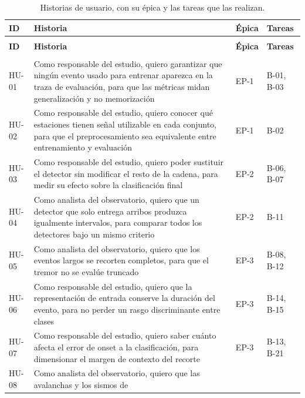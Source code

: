 {\small
\begin{longtable}{>{\raggedright\arraybackslash}p{1.2cm}>{\raggedright\arraybackslash}p{7.6cm}>{\raggedright\arraybackslash}p{1.0cm}>{\raggedright\arraybackslash}p{1.9cm}}
\caption{Historias de usuario, con su épica y las tareas que las realizan.}\label{tab:historias}\\
\toprule
\textbf{ID} & \textbf{Historia} & \textbf{Épica} & \textbf{Tareas} \\
\midrule
\endfirsthead
\multicolumn{4}{l}{\itshape Cuadro \thetable{} (continuación)}\\
\toprule
\textbf{ID} & \textbf{Historia} & \textbf{Épica} & \textbf{Tareas} \\
\midrule
\endhead
\midrule
\multicolumn{4}{r}{\itshape Continúa en la página siguiente}\\
\endfoot
\bottomrule
\endlastfoot
HU-01 & Como responsable del estudio, quiero garantizar que ningún evento usado
para entrenar aparezca en la traza de evaluación, para que las métricas midan
generalización y no memorización & EP-1 & B-01, B-03 \\
\addlinespace
HU-02 & Como responsable del estudio, quiero conocer qué estaciones tienen señal
utilizable en cada conjunto, para que el preprocesamiento sea equivalente entre
entrenamiento y evaluación & EP-1 & B-02 \\
\addlinespace
HU-03 & Como responsable del estudio, quiero poder sustituir el detector sin
modificar el resto de la cadena, para medir su efecto sobre la clasificación
final & EP-2 & B-06, B-07 \\
\addlinespace
HU-04 & Como analista del observatorio, quiero que un detector que solo entrega
arribos produzca igualmente intervalos, para comparar todos los detectores bajo un
mismo criterio & EP-2 & B-11 \\
\addlinespace
HU-05 & Como analista del observatorio, quiero que los eventos largos se recorten
completos, para que el tremor no se evalúe truncado & EP-3 & B-08, B-12 \\
\addlinespace
HU-06 & Como responsable del estudio, quiero que la representación de entrada
conserve la duración del evento, para no perder un rasgo discriminante entre
clases & EP-3 & B-14, B-15 \\
\addlinespace
HU-07 & Como responsable del estudio, quiero saber cuánto afecta el error de onset
a la clasificación, para dimensionar el margen de contexto del recorte & EP-3 &
B-13, B-21 \\
\addlinespace
HU-08 & Como analista del observatorio, quiero que las avalanchas y los sismos de

\end{longtable}}
